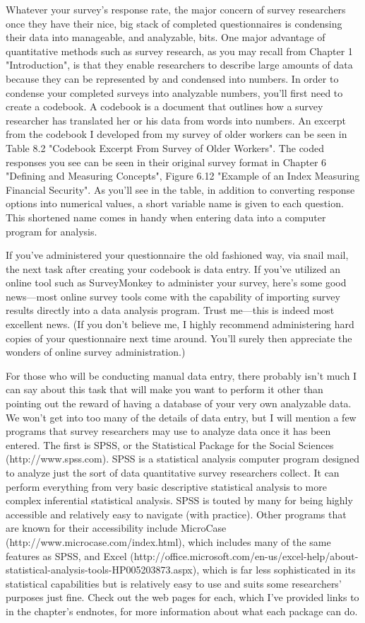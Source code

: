 Whatever your survey’s response rate, the major concern of survey researchers once they have their nice, big stack of completed questionnaires is condensing their data into manageable, and analyzable, bits. One major advantage of quantitative methods such as survey research, as you may recall from Chapter 1 "Introduction", is that they enable researchers to describe large amounts of data because they can be represented by and condensed into numbers. In order to condense your completed surveys into analyzable numbers, you’ll first need to create a codebook. A codebook is a document that outlines how a survey researcher has translated her or his data from words into numbers. An excerpt from the codebook I developed from my survey of older workers can be seen in Table 8.2 "Codebook Excerpt From Survey of Older Workers". The coded responses you see can be seen in their original survey format in Chapter 6 "Defining and Measuring Concepts", Figure 6.12 "Example of an Index Measuring Financial Security". As you’ll see in the table, in addition to converting response options into numerical values, a short variable name is given to each question. This shortened name comes in handy when entering data into a computer program for analysis.

If you’ve administered your questionnaire the old fashioned way, via snail mail, the next task after creating your codebook is data entry. If you’ve utilized an online tool such as SurveyMonkey to administer your survey, here’s some good news—most online survey tools come with the capability of importing survey results directly into a data analysis program. Trust me—this is indeed most excellent news. (If you don’t believe me, I highly recommend administering hard copies of your questionnaire next time around. You’ll surely then appreciate the wonders of online survey administration.)

For those who will be conducting manual data entry, there probably isn’t much I can say about this task that will make you want to perform it other than pointing out the reward of having a database of your very own analyzable data. We won’t get into too many of the details of data entry, but I will mention a few programs that survey researchers may use to analyze data once it has been entered. The first is SPSS, or the Statistical Package for the Social Sciences (http://www.spss.com). SPSS is a statistical analysis computer program designed to analyze just the sort of data quantitative survey researchers collect. It can perform everything from very basic descriptive statistical analysis to more complex inferential statistical analysis. SPSS is touted by many for being highly accessible and relatively easy to navigate (with practice). Other programs that are known for their accessibility include MicroCase (http://www.microcase.com/index.html), which includes many of the same features as SPSS, and Excel (http://office.microsoft.com/en-us/excel-help/about-statistical-analysis-tools-HP005203873.aspx), which is far less sophisticated in its statistical capabilities but is relatively easy to use and suits some researchers’ purposes just fine. Check out the web pages for each, which I’ve provided links to in the chapter’s endnotes, for more information about what each package can do.


